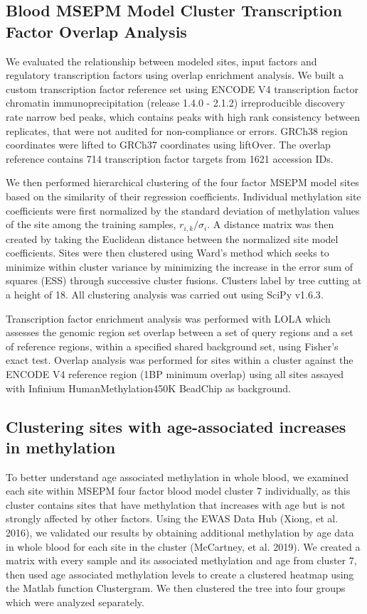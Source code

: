 \documentclass[sn-nature]{sn-jnl}
\begin{document}
{\begin{linenumbers}
\subsection{Blood MSEPM Model Cluster Transcription Factor Overlap Analysis}
We evaluated the relationship between modeled sites, input factors and regulatory transcription factors using overlap enrichment analysis.  
We built a custom transcription factor reference set using ENCODE V4 transcription factor chromatin immunoprecipitation\cite{ENCODE_Project_Consortium2012-oe,Davis2018-ha} 
(release 1.4.0 - 2.1.2)  irreproducible discovery rate narrow bed peaks, 
  which contains peaks with high rank consistency between replicates, that were not audited for non-compliance or errors. 
  GRCh38 region coordinates were lifted to GRCh37 coordinates using liftOver\cite{Hinrichs2006-oq}. The overlap reference 
  contains 714 transcription factor targets from 1621 accession IDs. 

We then performed hierarchical clustering of the four factor MSEPM model sites based on the similarity of their regression coefficients.
Individual methylation site coefficients were first normalized by the standard deviation of methylation values of the site among the training samples, $r_{i,k} / \sigma_{i}$. 
A distance matrix was then created by taking the Euclidean distance between the normalized site model coefficients. Sites were then clustered using Ward’s 
method which seeks to minimize within cluster variance by minimizing the increase in the error sum of squares (ESS) through successive cluster fusions.  
Clusters label by tree cutting at a height of 18. All clustering analysis was carried out using SciPy v1.6.3\cite{Virtanen2020-mm}.   

Transcription factor enrichment analysis was performed with  LOLA\cite{Sheffield2016-wg} which assesses the genomic 
region set overlap between a set of query regions and a set of reference regions, within a specified shared background set, 
using Fisher's exact test. Overlap analysis was performed for sites within a cluster against the ENCODE V4 reference region 
(1BP minimum overlap) using all sites assayed with Infinium HumanMethylation450K BeadChip as background.

\subsection{Clustering sites with age-associated increases in methylation}
To better understand age associated methylation in whole blood, we examined each site within MSEPM four factor blood model cluster 7 individually, 
as this cluster contains sites that have methylation that increases with age but is not strongly affected by other factors. 
Using the EWAS Data Hub (Xiong, et al. 2016), we validated our results by obtaining additional methylation by age data in 
whole blood for each site in the cluster (McCartney, et al. 2019).  We created a matrix with every sample and its associated 
methylation and age from cluster 7, then used age associated methylation levels to create a clustered heatmap using the Matlab 
function Clustergram. We then clustered the tree into four groups which were analyzed separately.


\end{linenumbers}}
\end{document}

